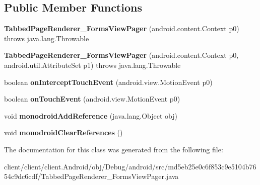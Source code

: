 \subsection*{Public Member Functions}
\begin{DoxyCompactItemize}
\item 
\hypertarget{classmd5eb25e0c6f853c9e5104b7654c9dc6cdf_1_1TabbedPageRenderer__FormsViewPager_ab208b292a63541e5c0d2a935d7449278}{}{\bfseries Tabbed\+Page\+Renderer\+\_\+\+Forms\+View\+Pager} (android.\+content.\+Context p0)  throws java.\+lang.\+Throwable 	\label{classmd5eb25e0c6f853c9e5104b7654c9dc6cdf_1_1TabbedPageRenderer__FormsViewPager_ab208b292a63541e5c0d2a935d7449278}

\item 
\hypertarget{classmd5eb25e0c6f853c9e5104b7654c9dc6cdf_1_1TabbedPageRenderer__FormsViewPager_a32d08fc7d3fbf5797f4729cbb06ba584}{}{\bfseries Tabbed\+Page\+Renderer\+\_\+\+Forms\+View\+Pager} (android.\+content.\+Context p0, android.\+util.\+Attribute\+Set p1)  throws java.\+lang.\+Throwable 	\label{classmd5eb25e0c6f853c9e5104b7654c9dc6cdf_1_1TabbedPageRenderer__FormsViewPager_a32d08fc7d3fbf5797f4729cbb06ba584}

\item 
\hypertarget{classmd5eb25e0c6f853c9e5104b7654c9dc6cdf_1_1TabbedPageRenderer__FormsViewPager_ac41dab3ed7110a8f398f9f1cb872dd88}{}boolean {\bfseries on\+Intercept\+Touch\+Event} (android.\+view.\+Motion\+Event p0)\label{classmd5eb25e0c6f853c9e5104b7654c9dc6cdf_1_1TabbedPageRenderer__FormsViewPager_ac41dab3ed7110a8f398f9f1cb872dd88}

\item 
\hypertarget{classmd5eb25e0c6f853c9e5104b7654c9dc6cdf_1_1TabbedPageRenderer__FormsViewPager_af3a35829b66484c673b1ed007b64f50a}{}boolean {\bfseries on\+Touch\+Event} (android.\+view.\+Motion\+Event p0)\label{classmd5eb25e0c6f853c9e5104b7654c9dc6cdf_1_1TabbedPageRenderer__FormsViewPager_af3a35829b66484c673b1ed007b64f50a}

\item 
\hypertarget{classmd5eb25e0c6f853c9e5104b7654c9dc6cdf_1_1TabbedPageRenderer__FormsViewPager_a2cfbba0f282bb2bc888cb4ff2e187d35}{}void {\bfseries monodroid\+Add\+Reference} (java.\+lang.\+Object obj)\label{classmd5eb25e0c6f853c9e5104b7654c9dc6cdf_1_1TabbedPageRenderer__FormsViewPager_a2cfbba0f282bb2bc888cb4ff2e187d35}

\item 
\hypertarget{classmd5eb25e0c6f853c9e5104b7654c9dc6cdf_1_1TabbedPageRenderer__FormsViewPager_a380161a8e1b95eacc468f9d217ae67d9}{}void {\bfseries monodroid\+Clear\+References} ()\label{classmd5eb25e0c6f853c9e5104b7654c9dc6cdf_1_1TabbedPageRenderer__FormsViewPager_a380161a8e1b95eacc468f9d217ae67d9}

\end{DoxyCompactItemize}


The documentation for this class was generated from the following file\+:\begin{DoxyCompactItemize}
\item 
client/client/client.\+Android/obj/\+Debug/android/src/md5eb25e0c6f853c9e5104b7654c9dc6cdf/Tabbed\+Page\+Renderer\+\_\+\+Forms\+View\+Pager.\+java\end{DoxyCompactItemize}
